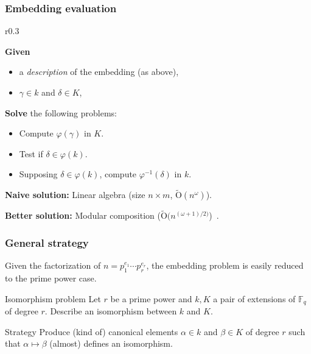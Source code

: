 \documentclass[francais]{beamer}
\def\F {\ensuremath{\mathbb{F}}}
\def\tildO {\ensuremath{\mathrm{\tilde{O}}}}
\begin{document}
\begin{frame}\frametitle{Embedding evaluation}
      \begin{wrapfigure}[6]{r}{0.3\textwidth}
      \centering
    \end{wrapfigure}

    \textbf{Given}
    \begin{itemize}
    \item a \emph{description} of the embedding (as above),
    \item $\gamma\in k$ and $\delta\in K$,
    \end{itemize}

    \textbf{Solve} the following problems:
    \begin{itemize}
    \item Compute $\varphi(\gamma)$ in $K$.
    \item Test if $\delta\in\varphi(k)$.
    \item Supposing $\delta\in\varphi(k)$, compute $\varphi^{-1}(\delta)$ in $k$.
    \end{itemize}

    \vfill
    
    \textbf{Naive solution:} Linear algebra (size $n\times m$, $\tildO(n^\omega)$).

    \textbf{Better solution:} Modular composition ($\tildO(n^{(\omega+1)/2)}$)~\cite{ffisom-long}.
\end{frame}

\begin{frame}\frametitle{General strategy}

  Given the factorization of $n = p_1^{e_1} \cdots p_r^{e_r}$,
  the embedding problem is easily reduced to the prime power case.
  \begin{block}{Isomorphism problem}
    Let $r$ be a prime power and $k, K$ a pair of extensions of $\F_q$
    of degree $r$.
    Describe an isomorphism between $k$ and $K$.
  \end{block}

  \begin{block}{Strategy}
    Produce (kind of) canonical elements $\alpha\in k$ and $\beta\in K$ of degree $r$
    such that $\alpha \mapsto \beta$ (almost) defines an isomorphism.
  \end{block}
\end{frame}
\end{document}
